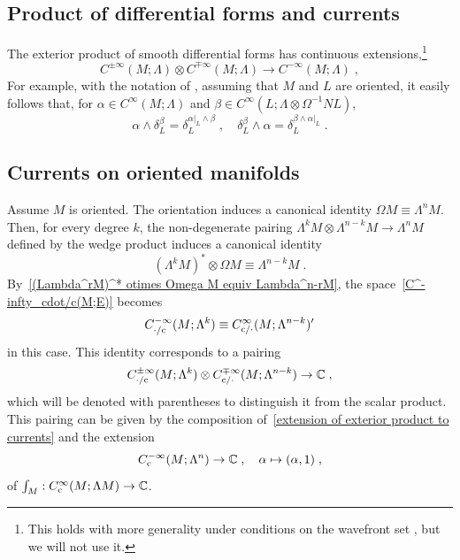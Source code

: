 \documentclass{memo-l}
\theoremstyle{plain}
\theoremstyle{definition}
\theoremstyle{remark}
\newcommand{\C}{\mathbb{C}}
\newcommand{\co}{{\text{\rm c}}}
\newcommand{\Cinftyc}{C^\infty_{\text{\rm c}}}
\numberwithin{section}{chapter}
\numberwithin{equation}{section}%
\begin{document}
\subsection{Product of differential forms and currents}
\label{ss: product of diff forms and currents}

The exterior product of smooth differential forms has continuous extensions,\footnote{This holds with more generality under conditions on the wavefront set \cite[Theorem~8.2.10]{Hormander1971}, but we will not use it.}
\begin{equation}\label{extension of exterior product to currents}
C^{\pm\infty}(M;\Lambda)\otimes C^{\mp\infty}(M;\Lambda)\to C^{-\infty}(M;\Lambda)\;,
\end{equation}
For example, with the notation of , assuming that $M$ and $L$ are oriented, it easily follows that, for $\alpha\in C^\infty(M;\Lambda)$ and $\beta\in C^\infty(L;\Lambda\otimes\Omega^{-1}NL)$,
\begin{equation}\label{alpha wedge delta_L^beta}
\alpha\wedge\delta_L^\beta=\delta_L^{\alpha|_L\wedge\beta}\;,\quad
\delta_L^\beta\wedge\alpha=\delta_L^{\beta\wedge\alpha|_L}\;.
\end{equation}



\subsection{Currents on oriented manifolds}

Assume $M$ is oriented. The orientation induces a canonical identity $\Omega M\equiv\Lambda^nM$. Then, for every degree $k$, the non-degenerate pairing $\Lambda^kM\otimes\Lambda^{n-k}M\to\Lambda^nM$ defined by the wedge product induces a canonical identity
\begin{equation}\label{(Lambda^rM)^* otimes Omega M equiv Lambda^n-rM}
(\Lambda^kM)^*\otimes\Omega M\equiv\Lambda^{n-k}M\;.
\end{equation}
By~\eqref{(Lambda^rM)^* otimes Omega M equiv Lambda^n-rM}, the space~\eqref{C^-infty_cdot/c(M;E)} becomes
\begin{equation}\label{C^-infty(M Lambda^r) equiv C^infty_c(M Lambda^n-r)'}
C^{-\infty}_{{\cdot}/\co}(M;\Lambda^k)\equiv C^\infty_{\co/{\cdot}}(M;\Lambda^{n-k})'
\end{equation}
in this case. This identity corresponds to a pairing
\[
C^{\pm\infty}_{{\cdot}/\co}(M;\Lambda^k)\otimes C^{\mp\infty}_{\co/{\cdot}}(M;\Lambda^{n-k})\to\C\;,
\]
which will be denoted with parentheses to distinguish it from the scalar product. This pairing can be given by the composition of~\eqref{extension of exterior product to currents} and the extension
\[
C^{-\infty}_\co(M;\Lambda^n)\to\C\;,\quad\alpha\mapsto(\alpha,1)\;,
\]
of $\int_M:\Cinftyc(M;\Lambda M)\to\C$. 
\end{document}
